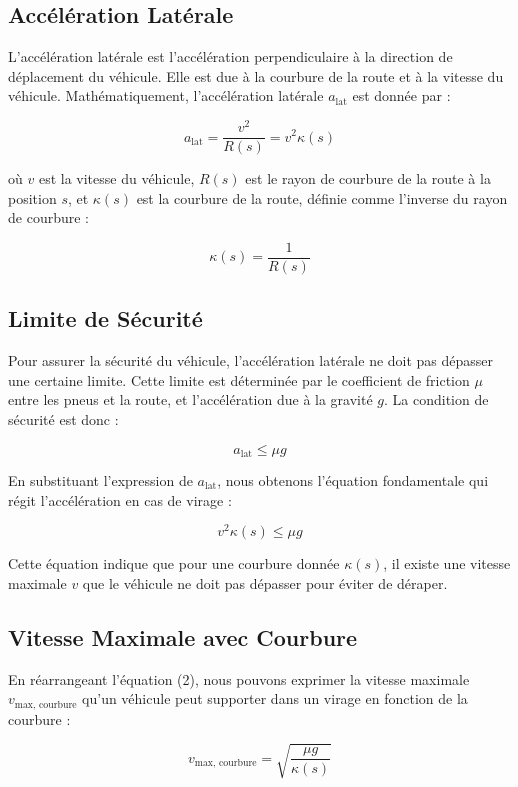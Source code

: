 \documentclass[a4paper,12pt]{article}
\begin{document}
\subsection{Accélération Latérale}

L'accélération latérale est l'accélération perpendiculaire à la direction de déplacement du véhicule. Elle est due à la courbure de la route et à la vitesse du véhicule. Mathématiquement, l'accélération latérale \( a_{\text{lat}} \) est donnée par :

\[
a_{\text{lat}} = \frac{v^2}{R(s)} = v^2 \kappa(s)
\]

où \( v \) est la vitesse du véhicule, \( R(s) \) est le rayon de courbure de la route à la position \( s \), et \( \kappa(s) \) est la courbure de la route, définie comme l'inverse du rayon de courbure :

\[
\kappa(s) = \frac{1}{R(s)}
\]

\subsection{Limite de Sécurité}

Pour assurer la sécurité du véhicule, l'accélération latérale ne doit pas dépasser une certaine limite. Cette limite est déterminée par le coefficient de friction \( \mu \) entre les pneus et la route, et l'accélération due à la gravité \( g \). La condition de sécurité est donc :

\[
a_{\text{lat}} \leq \mu g
\]

En substituant l'expression de \( a_{\text{lat}} \), nous obtenons l'équation fondamentale qui régit l'accélération en cas de virage :

\[
v^2 \kappa(s) \leq \mu g \tag{2}
\]

Cette équation indique que pour une courbure donnée \( \kappa(s) \), il existe une vitesse maximale \( v \) que le véhicule ne doit pas dépasser pour éviter de déraper.

\subsection{Vitesse Maximale avec Courbure}

En réarrangeant l'équation (2), nous pouvons exprimer la vitesse maximale \( v_{\text{max, courbure}} \) qu'un véhicule peut supporter dans un virage en fonction de la courbure :

\[
v_{\text{max, courbure}} = \sqrt{\frac{\mu g}{\kappa(s)}}
\]
\end{document}
